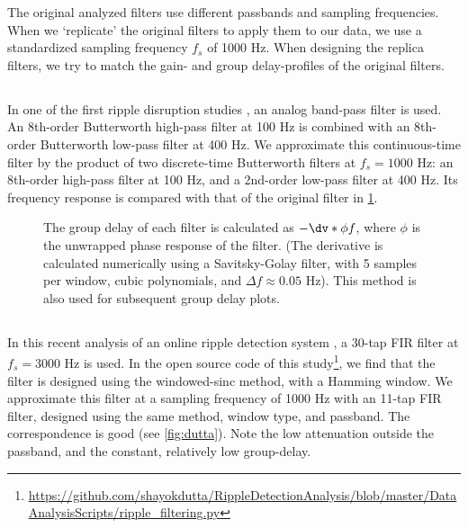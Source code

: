 The original analyzed filters use different passbands and sampling frequencies. When we `replicate' the original filters to apply them to our data, we use a standardized sampling frequency $f_s$ of 1000 Hz. When designing the replica filters, we try to match the gain- and group delay-profiles of the original filters.


\subsection{}

In one of the first ripple disruption studies \cite{Ego-Stengel2009}, an analog band-pass filter is used. An 8th-order Butterworth high-pass filter at 100 Hz is combined with an 8th-order Butterworth low-pass filter at 400 Hz.
We approximate this continuous-time filter by the product of two discrete-time Butterworth filters at $f_s = 1000$ Hz: an 8th-order high-pass filter at 100 Hz, and a 2nd-order low-pass filter at 400 Hz.\footnotemark{} Its frequency response is compared with that of the original filter in \cref{fig:ego-stengel}.


\begin{figure}
{The group delay of each filter is calculated as $-\dv*{\phi}{f}$, where $\phi$ is the unwrapped phase response of the filter. (The derivative is calculated numerically using a Savitsky-Golay filter, with 5 samples per window, cubic polynomials, and $\Delta f \approx 0.05$ Hz). This method is also used for subsequent group delay plots.}
\label{fig:ego-stengel}
\end{figure}


\subsection{}

In this recent analysis of an online ripple detection system \cite{Dutta2018}, a 30-tap FIR filter at $f_s = 3000$ Hz is used. In the open source code of this study\footnote{\url{https://github.com/shayokdutta/RippleDetectionAnalysis/blob/master/DataAnalysisScripts/ripple_filtering.py}}, we find that the filter is designed using the windowed-sinc method, with a Hamming window. We approximate this filter at a sampling frequency of 1000 Hz with an 11-tap FIR filter, designed using the same method, window type, and passband. The correspondence is good (see \cref{fig:dutta}). Note the low attenuation outside the passband, and the constant, relatively low group-delay.

